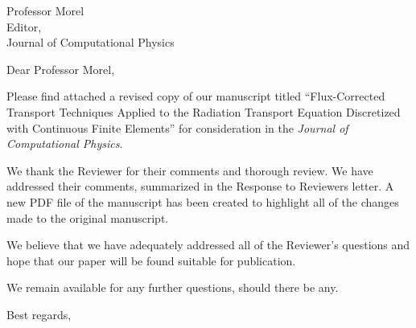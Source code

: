 
        \addtolength{\topmargin}{-3.5cm}    %
       \addtolength{\textheight}{7cm}    %

\address{Jean Ragusa\\ 
Department of Nuclear Engineering \\
Texas A\&M University\\
College Station, TX 77843-3133, USA\\
phone: (979) 862 2033\\
e-mail: jean.ragusa@tamu.edu \vspace{0.5cm}}


\signature{\vspace{-1.25cm}Joshua Hansel \& Jean Ragusa}   




\begin{letter}{Professor Morel\\
    Editor,\\
    Journal of Computational Physics}
\date{\today}

\opening{Dear Professor Morel,}
         \vspace{0.25cm}

Please find attached a revised copy of our manuscript titled ``Flux-Corrected Transport Techniques Applied to the Radiation Transport Equation Discretized with Continuous Finite Elements'' for consideration in the {\em Journal of Computational Physics}. 

We thank the Reviewer for their comments and thorough review. We have addressed their comments, summarized in the Response to Reviewers letter.  A new PDF file of the manuscript has been created to highlight all of the changes made to the original manuscript. 

We believe that we have adequately addressed all of the Reviewer's questions and hope that our paper will be found suitable for publication.

We remain available for any further questions, should there be any.

\vspace{0.25cm}



\closing{Best regards, }

\end{letter}


